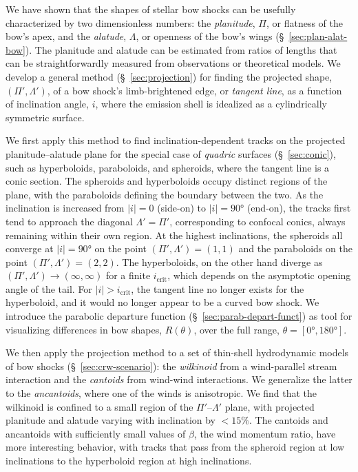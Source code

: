 \documentclass[useAMS, usenatbib, a4paper]{mnras}
\providecommand{\abs}[1]{\lvert#1\rvert}
\begin{document}
We have shown that the shapes of stellar bow shocks can be usefully
characterized by two dimensionless numbers: the \textit{planitude},
\(\Pi\), or flatness of the bow's apex, and the \textit{alatude},
\(\Lambda\), or openness of the bow's wings (\S~\ref{sec:plan-alat-bow}).
The planitude and alatude can be estimated from ratios of lengths that
can be straightforwardly measured from observations or theoretical
models.  We develop a general method (\S~\ref{sec:projection}) for
finding the projected shape, \((\Pi', \Lambda')\), of a bow shock's
limb-brightened edge, or \textit{tangent line}, as a function of
inclination angle, \(i\), where the emission shell is idealized as a
cylindrically symmetric surface.

We first apply this method to find inclination-dependent tracks on the
projected planitude--alatude plane for the special case of
\textit{quadric} surfaces (\S~\ref{sec:conic}), such as hyperboloids,
paraboloids, and spheroids, where the tangent line is a conic section.
The spheroids and hyperboloids occupy distinct regions of the plane,
with the paraboloids defining the boundary between the two.  As the
inclination is increased from \(\abs{i} = 0\) (side-on) to
\(\abs{i} = \ang{90}\) (end-on), the tracks first tend to approach the
diagonal \(\Lambda' = \Pi'\), corresponding to confocal conics, always
remaining within their own region.  At the highest inclinations, the
spheroids all converge at \(\abs{i} = \ang{90}\) on the point
\((\Pi', \Lambda') = (1, 1)\) and the paraboloids on the point
\((\Pi', \Lambda') = (2, 2)\).  The hyperboloids, on the other hand diverge as
\((\Pi', \Lambda') \to (\infty, \infty)\) for a finite
\(i_{\mathrm{crit}}\), which depends on the asymptotic opening angle
of the tail.  For \(\abs{i} > i_{\mathrm{crit}}\), the tangent line no
longer exists for the hyperboloid, and it would no longer appear to be
a curved bow shock.  We introduce the parabolic departure function
(\S~\ref{sec:parab-depart-funct}) as tool for visualizing differences
in bow shapes, \(R(\theta)\), over the full range,
\(\theta = [\ang{0}, \ang{180}]\).

We then apply the projection method to a set of thin-shell
hydrodynamic models of bow shocks (\S~\ref{sec:crw-scenario}): the
\textit{wilkinoid} from a wind-parallel stream interaction and the
\textit{cantoids} from wind-wind interactions.  We generalize the
latter to the \textit{ancantoids}, where one of the winds is
anisotropic.  We find that the wilkinoid is confined to a small region
of the \(\Pi'\)--\(\Lambda'\) plane, with projected planitude and alatude
varying with inclination by \(< 15\%\).  The cantoids and ancantoids
with sufficiently small values of \(\beta\), the wind momentum ratio, have
more interesting behavior, with tracks that pass from the spheroid
region at low inclinations to the hyperboloid region at high
inclinations.
\end{document}

